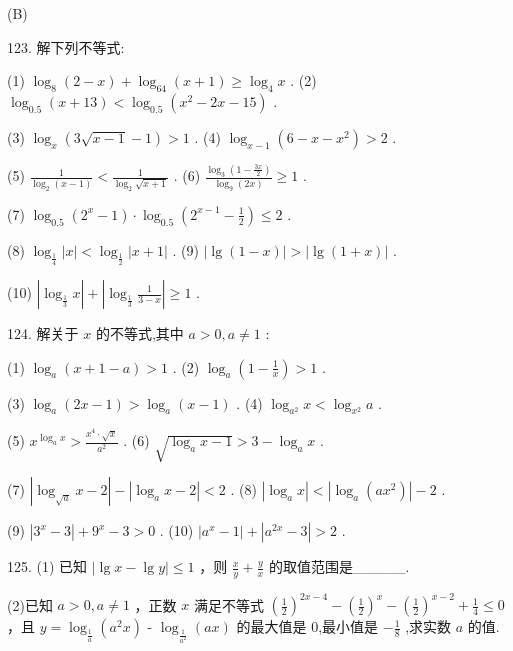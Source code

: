 \documentclass[10pt]{article}
\begin{document}
(B)

123. 解下列不等式:

(1) \({\log }_{8}\left( {2 - x}\right)  + {\log }_{64}\left( {x + 1}\right)  \geq  {\log }_{4}x\) . (2) \({\log }_{0.5}\left( {x + {13}}\right)  < {\log }_{0.5}\left( {{x}^{2} - {2x} - {15}}\right)\) .

(3) \({\log }_{x}\left( {3\sqrt{x - 1} - 1}\right)  > 1\) . (4) \({\log }_{x - 1}\left( {6 - x - {x}^{2}}\right)  > 2\) .

(5) \(\frac{1}{{\log }_{2}\left( {x - 1}\right) } < \frac{1}{{\log }_{2}\sqrt{x + 1}}\) . (6) \(\frac{{\log }_{3}\left( {1 - \frac{3x}{2}}\right) }{{\log }_{9}\left( {2x}\right) } \geq  1\) .

(7) \({\log }_{0.5}\left( {{2}^{x} - 1}\right)  \cdot  {\log }_{0.5}\left( {{2}^{x - 1} - \frac{1}{2}}\right)  \leq  2\) .

(8) \({\log }_{\frac{1}{4}}\left| x\right|  < {\log }_{\frac{1}{2}}\left| {x + 1}\right|\) . (9) \(\left| {\lg \left( {1 - x}\right) }\right|  > \left| {\lg \left( {1 + x}\right) }\right|\) .

(10) \(\left| {{\log }_{\frac{1}{3}}x}\right|  + \left| {{\log }_{\frac{1}{3}}\frac{1}{3 - x}}\right|  \geq  1\) .

124. 解关于 \(x\) 的不等式,其中 \(a > 0,a \neq  1\) :

(1) \({\log }_{a}\left( {x + 1 - a}\right)  > 1\) . (2) \({\log }_{a}\left( {1 - \frac{1}{x}}\right)  > 1\) .

(3) \({\log }_{a}\left( {{2x} - 1}\right)  > {\log }_{a}\left( {x - 1}\right)\) . (4) \({\log }_{{a}^{2}}x < {\log }_{{x}^{2}}a\) .

(5) \({x}^{{\log }_{a}x} > \frac{{x}^{4} \cdot  \sqrt{x}}{{a}^{2}}\) . (6) \(\sqrt{{\log }_{a}x - 1} > 3 - {\log }_{a}x\) .

(7) \(\left| {{\log }_{\sqrt{a}}x - 2}\right|  - \left| {{\log }_{a}x - 2}\right|  < 2\) . (8) \(\left| {{\log }_{a}x}\right|  < \left| {{\log }_{a}\left( {a{x}^{2}}\right) }\right|  - 2\) .

(9) \(\left| {{3}^{x} - 3}\right|  + {9}^{x} - 3 > 0\) . (10) \(\left| {{a}^{x} - 1}\right|  + \left| {{a}^{2x} - 3}\right|  > 2\) .

125. (1) 已知 \(\left| {\lg x - \lg y}\right|  \leq  1\) ，则 \(\frac{x}{y} + \frac{y}{x}\) 的取值范围是\_\_\_\_\_.

(2)已知 \(a > 0,a \neq  1\) ，正数 \(x\) 满足不等式 \({\left( \frac{1}{2}\right) }^{{2x} - 4} - {\left( \frac{1}{2}\right) }^{x} - {\left( \frac{1}{2}\right) }^{x - 2} + \frac{1}{4} \leq  0\) ，且 \(y = {\log }_{\frac{1}{a}}\left( {{a}^{2}x}\right)\) - \({\log }_{\frac{1}{{a}^{2}}}\left( {ax}\right)\) 的最大值是 0,最小值是 \(- \frac{1}{8}\) ,求实数 \(a\) 的值.
\end{document}
